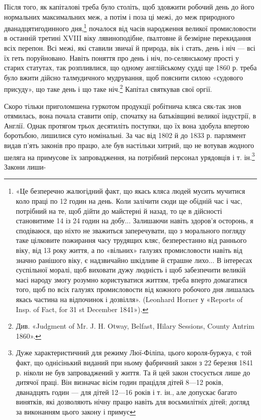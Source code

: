 Після того, як капіталові треба було століть, щоб здовжити
робочий день до його нормальних максимальних меж, а потім і
поза ці межі, до меж природного дванадцятигодинного дня,\footnote{
«Це безперечно жалюгідний факт, що якась кляса людей мусить
мучитися коло праці по 12 годин на день. Коли залічити сюди ще обідній
час і час, потрібний на те, щоб дійти до майстерні й назад, то це в дійсності
становитиме 14 із 24 годин на добу... Залишаючи навіть здоров’я осторонь,
я сподіваюся, що ніхто не зважиться заперечувати, що з морального
погляду таке цілковите пожирання часу трудящих кляс, безперестанно
від раннього віку, від 13 року життя, а по «вільних» галузях промисловости
навіть від значно ранішого віку, є надзвичайно шкідливе й страшне
лихо... В інтересах суспільної моралі, щоб виховати дужу людність
і щоб забезпечити великій масі народу змогу розумно користуватися
життям, треба вперто домагатися того, щоб по всіх галузях промисловости
від кожного робочого дня лишалась якась частина на відпочинок і дозвілля».
(Leonhard Horner у «Reports of Insp. of Fact, for 31 st December
1841»).
}
почалося від часів народження великої промисловости в останній
третині XVIII віку лявиноподібне, ґвалтовне й безмірне перекидання
всіх перепон. Всі межі, які ставили звичаї й природа,
вік і стать, день і ніч — всі їх геть поруйновано. Навіть поняття
про день і ніч, по-селянському прості у старих статутах, так
розпливлися, що одному англійському судді ще 1860 р. треба
було вжити дійсно талмудичного мудрування, щоб пояснити
силою «судового присуду», що таке день і що таке ніч.\footnote{
Див. «Judgment of Mr. J. H. Otway, Belfast, Hilary Sessions,
County Antrim 1860».
} Капітал
святкував свої оргії.

Скоро тільки приголомшена гуркотом продукції робітнича
кляса сяк-так знов отямилась, вона почала ставити опір, спочатку
на батьківщині великої індустрії, в Англії. Однак протягом
трьох десятиліть поступки, що їх вона здобула впертою боротьбою,
лишилися суто номінальні. За час від 1802 й до 1833 р.
парлямент видав п’ять законів про працю, але був настільки
хитрий, що не вотував жодного шеляга на примусове їх запровадження,
на потрібний персонал урядовців і т. ін.\footnote{
Дуже характеристичний для режиму Люї-Філіпа, цього короля-буржуа,
є той факт, що однісінький виданий при ньому фабричний
закон з 22 березня 1841 р. ніколи не був запроваджений у життя. Та й цей
закон стосується лише до дитячої праці. Він визначає вісім годин працідля
дітей 8—12 років, дванадцять годин — для дітей 12—16 років і
т. ін., але допускає багато винятків, які дозволяють нічну працю навіть
для восьмилітніх дітей; догляд за виконанням цього закону і примус
} Закони лиши-

